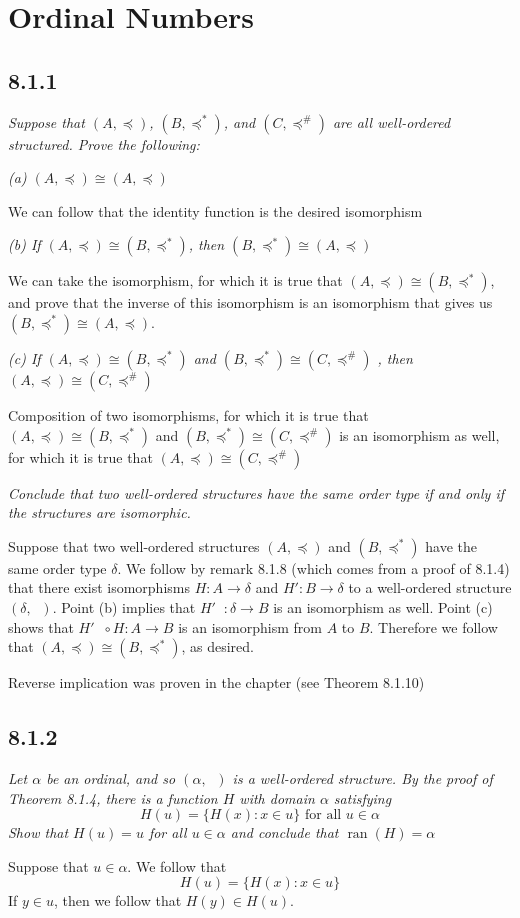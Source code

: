 \documentclass[11pt,oneside,titlepage]{book}
\DeclareMathOperator \inv {^{-1}}
\DeclareMathOperator \ran {ran}
\DeclareMathOperator \ineq {\underline{\in}}
\newcommand{\set}[1]{\{ #1 \}}
\begin{document}
\section{Ordinal Numbers}

\subsection{8.1.1}

\textit{Suppose that $(A, \preceq)$, $(B, \preceq^*)$, and $(C, \preceq^\#)$ are all
  well-ordered structured. Prove the following: }

\textit{(a) $(A, \preceq) \cong (A, \preceq)$}

We can follow that the identity function is the desired isomorphism

\textit{(b) If $(A, \preceq) \cong (B, \preceq^*)$, then $(B, \preceq^*) \cong (A, \preceq)$}

We can take the isomorphism, for which it is true that
$(A, \preceq) \cong (B, \preceq^*)$, and prove that the inverse of this isomorphism is
an isomorphism that gives us
$(B, \preceq^*) \cong (A, \preceq)$.

\textit{(c) If $(A, \preceq) \cong (B, \preceq^*)$ and $(B, \preceq^*) \cong (C, \preceq^\#)$ ,
  then $(A, \preceq) \cong (C, \preceq^\#)$}

Composition of two isomorphisms, for which it is true that
$(A, \preceq) \cong (B, \preceq^*)$ and $(B, \preceq^*) \cong (C, \preceq^\#)$
is an isomorphism as well, for which it is true that
$(A, \preceq) \cong (C, \preceq^\#)$

\textit{Conclude that two well-ordered structures have the same order type if and only if
  the structures are isomorphic.}

Suppose that two well-ordered structures $(A, \preceq)$ and $(B, \preceq^*)$ have
the same order type $\delta$. We follow by remark 8.1.8 (which comes from a proof of 8.1.4)
that there exist isomorphisms
$H: A \to \delta$ and $H': B \to \delta$ to a well-ordered structure $(\delta, \ineq)$.
Point (b) implies that $H'\inv: \delta \to B$ is an isomorphism as well. Point (c)
shows that $H'\inv \circ H: A \to B$ is an isomorphism from $A$ to $B$. Therefore we
follow that $(A, \preceq) \cong (B, \preceq^*)$, as desired.

Reverse implication was proven in the chapter (see Theorem 8.1.10)

\subsection*{8.1.2}

\textit{Let $\alpha$ be an ordinal, and so $(\alpha, \ineq)$ is a well-ordered structure.
  By the proof of Theorem 8.1.4, there is a function $H$ with domain $\alpha$
  satisfying 
  $$H(u) = \set{H(x): x \in u} \text{ for all } u \in \alpha$$
  Show that $H(u) = u$ for all $u \in \alpha$ and conclude that $\ran(H) = \alpha$}

Suppose that $u \in \alpha$. We follow that
$$H(u) = \set{H(x): x \in u}$$
If $y \in u$, then we follow that $H(y) \in H(u)$.
\end{document}
